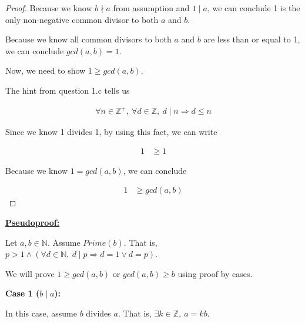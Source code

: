 \documentclass[12pt]{article}
\begin{document}
\begin{enumerate}[a.]
\begin{proof}
        Because we know $b \nmid a$ from assumption and $1 \mid a$, we
        can conclude 1 is the only non-negative common divisor to both
        $a$ and $b$.

        \bigskip

        Because we know all common divisors to both $a$ and $b$
        are less than or equal to 1, we can conclude $gcd(a,b) = 1$.


        \bigskip

        Now, we need to show $1 \geq gcd(a,b)$.

        \bigskip

        The hint from question 1.c tells us

        \begin{align}
            \forall n \in \mathbb{Z}^{+},\:\forall d \in \mathbb{Z},\:d \mid n \Rightarrow d \leq n
        \end{align}

        Since we know 1 divides 1, by using this fact, we can write

        \begin{align}
            1 &\geq 1
        \end{align}

        Because we know $1 = gcd(a,b)$, we can conclude

        \begin{align}
            1 &\geq gcd(a,b)
        \end{align}

    \end{proof}

    \bigskip

    \begin{mdframed}
        \underline{\textbf{Pseudoproof:}}

        \bigskip

        Let $a,b \in \mathbb{N}$. Assume $Prime(b)$. That is, $p > 1 \land (\forall
        d \in \mathbb{N},\:d \mid p \Rightarrow d = 1 \lor d = p)$.

        \bigskip

        We will prove $1 \geq gcd(a,b)$ or $gcd(a,b) \geq b$ using proof by cases.

        \bigskip

        \textbf{Case 1 ($b \mid a$):}

        \bigskip

        In this case, assume $b$ divides $a$. That is, $\exists k \in \mathbb{Z},\:a = kb$.


\end{mdframed}
\end{enumerate}
\end{document}
